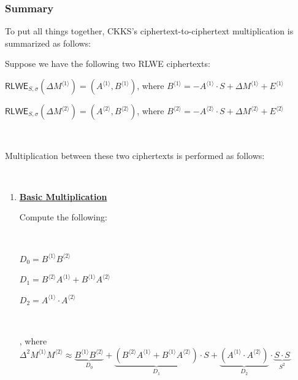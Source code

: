 \subsubsection{Summary}
\label{subsubsec:ckks-mult-cipher-summary}

To put all things together, CKKS's ciphertext-to-ciphertext multiplication is summarized as follows:

\begin{tcolorbox}[title={\textbf{\tboxlabel{\ref*{subsubsec:ckks-mult-cipher-summary}} CKKS's Ciphertext-to-Ciphertext Multiplication}}]


Suppose we have the following two RLWE ciphertexts:

$\textsf{RLWE}_{S, \sigma}(\Delta M^{\langle 1 \rangle}) = (A^{\langle 1 \rangle}, B^{\langle 1 \rangle})$, \text{ } where $B^{\langle 1 \rangle} = -A^{\langle 1 \rangle} \cdot S + \Delta M^{\langle 1 \rangle} + E^{\langle 1 \rangle}$

$\textsf{RLWE}_{S, \sigma}(\Delta M^{\langle 2 \rangle}) = (A^{\langle 2 \rangle}, B^{\langle 2 \rangle})$, \text{ } where $B^{\langle 2 \rangle} = -A^{\langle 2 \rangle} \cdot S + \Delta M^{\langle 2 \rangle} + E^{\langle 2 \rangle}$

$ $

Multiplication between these two ciphertexts is performed as follows:

$ $

\begin{enumerate}
\item \textbf{\underline{Basic Multiplication}}

Compute the following:

$ $

$D_0 = B^{\langle 1 \rangle}B^{\langle 2 \rangle}$

$D_1 = B^{\langle 2 \rangle}A^{\langle 1 \rangle} + B^{\langle 1 \rangle}A^{\langle 2 \rangle}$

$D_2 = A^{\langle 1 \rangle} \cdot A^{\langle 2 \rangle}$

$ $

, where $\Delta^2M^{\langle 1 \rangle}M^{\langle 2 \rangle} \approx \underbrace{B^{\langle 1 \rangle}B^{\langle 2 \rangle}}_{D_0}  + \underbrace{(B^{\langle 2 \rangle}A^{\langle 1 \rangle} + B^{\langle 1 \rangle}A^{\langle 2 \rangle})}_{D_1} \cdot S + \underbrace{(A^{\langle 1 \rangle} \cdot A^{\langle 2 \rangle})}_{D_2} \cdot \underbrace{S \cdot S}_{ S^2}$


\end{enumerate}
\end{tcolorbox}
